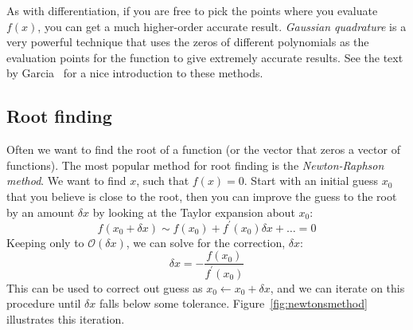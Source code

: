 As with differentiation, if you are free to pick the points where you
evaluate $f(x)$, you can get a much higher-order accurate result.
{\em Gaussian quadrature} is a very powerful technique that uses the
zeros of different polynomials as the evaluation points for the
function to give extremely accurate results.  See the text by
Garcia~\cite{garcia} for a nice introduction to these methods.


\subsection{Root finding}

Often we want to find the root of a function (or the vector that zeros
a vector of functions).  The most popular method for root finding is
the {\em Newton-Raphson method}.  We want to find $x$, such that $f(x)
= 0$.  Start with an initial guess $x_0$ that you believe is close to
the root, then you can improve the guess to the root by an amount
$\delta x$ by looking at the Taylor expansion about $x_0$:
\begin{equation}
f(x_0 + \delta x) \sim f(x_0) + f^\prime(x_0) \delta x + \ldots = 0
\end{equation}
Keeping only to $\mathcal{O}(\delta x)$, we can solve for the correction, $\delta x$:
\begin{equation}
\label{eq:intro:newtonsmethod}
  \delta x = -\frac{f(x_0)}{f^\prime(x_0)}
\end{equation}
This can be used to correct out guess as $x_0 \leftarrow x_0 + \delta
x$, and we can iterate on this procedure until $\delta x$ falls below
some tolerance.  Figure~\ref{fig:newtonsmethod} illustrates this
iteration.

